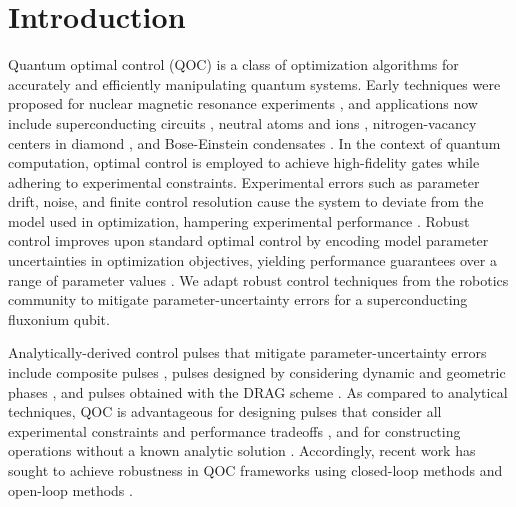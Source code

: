 \section{Introduction}
Quantum optimal control (QOC) is a class of optimization
algorithms for accurately and efficiently manipulating quantum systems.
Early techniques were proposed for nuclear magnetic resonance experiments
\cite{vandersypen2005nmr, kehlet2004improving, khaneja2005optimal,
  maximov2008optimal, nielsen2010optimal, skinner2003application, tosner2009optimal},
and applications now include superconducting circuits \cite{abdelhafez2020universal,
  chakram2020multimode, egger2013optimized, fisher2010optimal, gokhale2019partial,
  huang2014optimal, heeres2017implementing, kelly2014optimal, leng2019robust,
  leung2017speedup, li2020fast,
  liebermann2016optimal, reinhold2019controlling,
  rebentrost2009optimal, rebentrost2009optimal2, spiteri2018quantum,
  sporl2007optimal},
neutral atoms and ions \cite{brouzos2015quantum,
  de2008optimal, grace2007optimal, goerz2011quantum, guo2019high, jensen2019time,
  larrouy2020fast, nebendahl2009optimal, omran2019generation,
  rosi2013fast,
  treutlein2006microwave, van2016optimal},
nitrogen-vacancy centers in diamond \cite{chou2015optimal,
  dolde2014high, geng2016experimental,
  nobauer2015smooth, poggiali2018optimal, rembold2020introduction, tian2019optimal},
and Bose-Einstein condensates \cite{amri2019optimal, doria2011optimal,
  sorensen2019qengine, sorensen2018quantum}.
In the context of quantum computation,
optimal control is employed to achieve high-fidelity gates
while adhering to experimental constraints.
Experimental errors such as parameter drift, noise, and
finite control resolution cause the system to deviate
from the model used in optimization, hampering
experimental performance
\cite{chakram2020multimode, heeres2017implementing, klimov2020snake,
  omran2019generation, reinhold2019controlling}.
Robust control improves upon
standard optimal control by encoding
model parameter uncertainties
in optimization objectives, yielding performance
guarantees over a range of parameter values \cite{Zhou97,Morimoto00,Manchester18}.
We adapt robust control techniques from the robotics community to mitigate
parameter-uncertainty errors for
a superconducting fluxonium qubit.

Analytically-derived control pulses that mitigate parameter-uncertainty
errors include composite pulses \cite{cummins2000use, cummins2003tackling,
  kupce1995stretched, merrill2014progress},
pulses designed by considering dynamic and geometric phases
\cite{han2020experimental, xu2020nonadiabatic}, and
pulses obtained with the DRAG scheme \cite{motzoi2009simple}.
As compared to analytical techniques, QOC is advantageous for
designing pulses that consider all experimental constraints and
performance tradeoffs
\cite{leung2017speedup},
and for constructing operations without a known analytic solution
\cite{chakram2020multimode, heeres2017implementing}.
Accordingly, recent work has sought to achieve robustness in QOC
frameworks using closed-loop methods \cite{egger2014adaptive, feng2018gradient,
  li2017hybrid, wittler2020integrated} and open-loop methods \cite{
  allen2019robust, carvalho2020error, reinhold2019controlling,
  rembold2020introduction, kosut2013robust, niu2019universal}.

